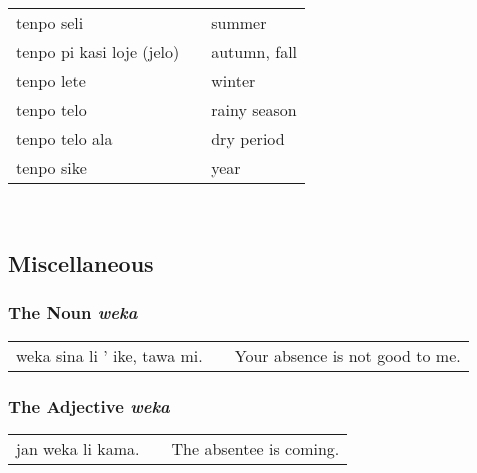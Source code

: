 \begin{supertabular}{p{5,5cm}|ll}
    tenpo seli                             &  & summer                    \\
    tenpo pi kasi loje (jelo)              &  & autumn, fall              \\
    tenpo lete                             &  & winter                    \\
    tenpo telo                             &  & rainy season              \\
    tenpo telo ala                         &  & dry period                \\
    tenpo sike                             &  & year                      \\
\end{supertabular} \\
%
%
%
%
%
\subsection*{Miscellaneous}
%
%
\subsubsection*{The Noun \textit{weka}}
%

\begin{supertabular}{p{5,5cm}|ll}
    weka sina li ' ike, tawa mi. &  & Your absence is not good to me. \\
\end{supertabular}
%
\subsubsection*{The Adjective \textit{weka}}
%

\begin{supertabular}{p{5,5cm}|ll}
    jan weka li kama. &  & The absentee is coming. \\
\end{supertabular}

%
